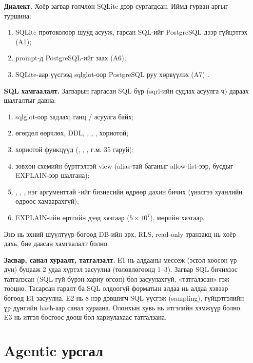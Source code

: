 \textbf{Диалект.} Хоёр загвар голчлон SQLite дээр сургагдсан. Иймд гурван аргыг туршина:
\begin{enumerate}
  \item SQLite протоколоор шууд асууж, гарсан SQL-ийг PostgreSQL дээр гүйцэтгэх (A1);
  \item prompt-д PostgreSQL-ийг заах (A6);
  \item SQLite-аар үүсгээд sqlglot-оор PostgreSQL руу хөрвүүлэх (A7) \cite{mao_2026_sqlglot}.
\end{enumerate}

\textbf{SQL хамгаалалт.} Загварын гаргасан SQL бүр (sqrl-ийн судлах асуулга ч) дараах шалгалтыг давна:
\begin{enumerate}
  \item sqlglot-оор задлах; ганц / асуулга байх;
  \item өгөгдөл өөрчлөх, DDL, , , ,  хориотой;
  \item хориотой функцүүд (, , ,  г.м. 35 гаруй);
  \item зөвхөн  схемийн бүртгэлтэй view (alias-тай баганыг allow-list-ээр, бусдыг EXPLAIN-ээр шалгана);
  \item {}, , , нэг аргументтай -ийг бизнесийн
        өдрөөр дахин бичих (үнэлгээ хуанлийн өдрөөс хамаарахгүй);
  \item EXPLAIN-ийн өртгийн дээд хязгаар ($5 \times 10^7$), мөрийн хязгаар.
\end{enumerate}
Энэ нь эхний шүүлтүүр бөгөөд DB-ийн эрх, RLS, read-only транзакц нь хоёр дахь, бие даасан хамгаалалт болно.

\textbf{Засвар, санал хураалт, татгалзалт.} E1 нь алдааны мессеж (эсвэл хоосон үр дүн) буцааж 2 удаа хүртэл засуулна
(төлөвлөгөөнд 1--3). Загвар SQL бичихээс татгалзсан (SQL-гүй бүрэн хариу өгсөн) бол засуулахгүй, «татгалзсан» гэж
тооцно. Тасарсан гаралт ба SQL олдоогүй форматын алдаа нь алдаа хэвээр бөгөөд E1 засуулна.
E2 нь 8 нэр дэвшигч SQL үүсгэж (sampling), гүйцэтгэлийн үр дүнгийн hash-аар санал хураана. Олонхын хувь нь итгэлийн
хэмжүүр болно. E3 нь итгэл босгоос доош бол хариулахаас татгалзана.

\section{Agentic урсгал}
\label{sec:agent}

